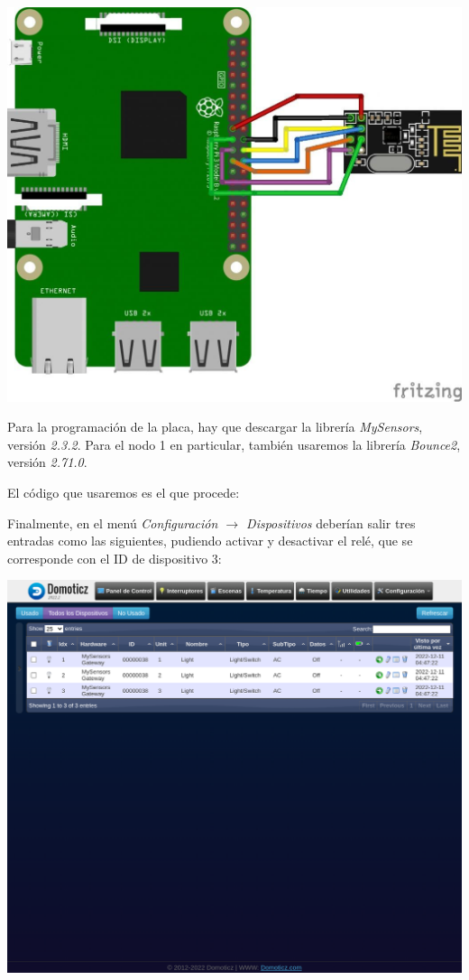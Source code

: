 \includegraphics[width=\linewidth]{rpi-nrf24l01-wiring.jpg}

Para la programación de la placa, hay que descargar la librería
\emph{MySensors}, versión \emph{2.3.2}\footnotemark. Para el nodo 1 en
particular, también usaremos la librería \emph{Bounce2}, versión
\emph{2.71.0}\footnotemark.


El código que usaremos es el que procede:



Finalmente, en el menú \emph{Configuración $\rightarrow$ Dispositivos} deberían
salir tres entradas como las siguientes, pudiendo activar y desactivar el relé,
que se corresponde con el ID de dispositivo 3:

\includegraphics[width=\linewidth]{nodo1/nodo1-domoticz.png}